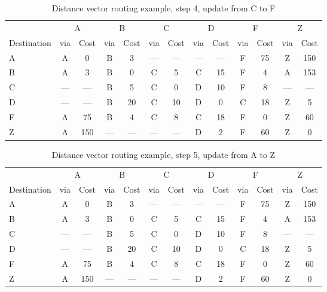 \begin{table}
    \caption{Distance vector  routing example, step 4, update from C to F }
    \label{tab:dv:step:4}
\begin{tabular}{l|c|c|c|c|c|c|c|c|c|c|c|c}
    \toprule
      & \multicolumn{2}{c|}{A}&\multicolumn{2}{c|}{B}&\multicolumn{2}{c|}{C}&\multicolumn{2}{c|}{D}&\multicolumn{2}{c|}{F}&\multicolumn{2}{c|}{Z} \\
    Destination & via&Cost&via&Cost&via&Cost&via&Cost&via&Cost&via&Cost \\ 
    \midrule
    A & A & 0 &B & 3 &--- & ---&--- & ---&F & 75 &Z & 150 
 \\B & A & 3 &B & 0 &C & 5 &C & 15 &F & 4 &A & 153 
 \\C & --- & ---&B & 5 &C & 0 &D & 10 &F & 8 &--- & ---
 \\D & --- & ---&B & 20 &C & 10 &D & 0 &C & 18 &Z & 5 
 \\F & A & 75 &B & 4 &C & 8 &C & 18 &F & 0 &Z & 60 
 \\Z & A & 150 &--- & ---&--- & ---&D & 2 &F & 60 &Z & 0 
    \\ \bottomrule 
\end{tabular}
\end{table}
    

\begin{table}
    \caption{Distance vector  routing example, step 5, update from A to Z }
    \label{tab:dv:step:5}
\begin{tabular}{l|c|c|c|c|c|c|c|c|c|c|c|c}
    \toprule
      & \multicolumn{2}{c|}{A}&\multicolumn{2}{c|}{B}&\multicolumn{2}{c|}{C}&\multicolumn{2}{c|}{D}&\multicolumn{2}{c|}{F}&\multicolumn{2}{c|}{Z} \\
    Destination & via&Cost&via&Cost&via&Cost&via&Cost&via&Cost&via&Cost \\ 
    \midrule
    A & A & 0 &B & 3 &--- & ---&--- & ---&F & 75 &Z & 150 
 \\B & A & 3 &B & 0 &C & 5 &C & 15 &F & 4 &A & 153 
 \\C & --- & ---&B & 5 &C & 0 &D & 10 &F & 8 &--- & ---
 \\D & --- & ---&B & 20 &C & 10 &D & 0 &C & 18 &Z & 5 
 \\F & A & 75 &B & 4 &C & 8 &C & 18 &F & 0 &Z & 60 
 \\Z & A & 150 &--- & ---&--- & ---&D & 2 &F & 60 &Z & 0 
    \\ \bottomrule 
\end{tabular}
\end{table}
    

